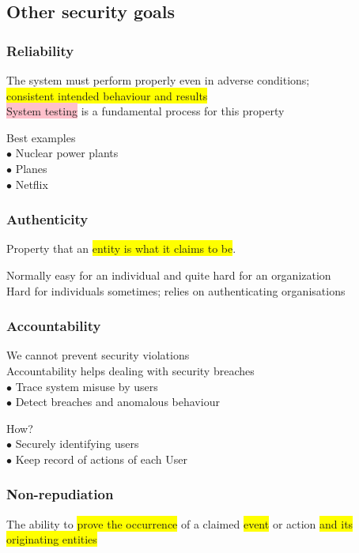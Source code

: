 \documentclass[tikz,border=10pt]{project_plan}
\newcommand{\bulletPoint}{\hspace{-3.1pt}$\bullet$ \hspace{5pt}}
\begin{document}
\subsection{Other security goals}

\subsubsection{Reliability}
The system must perform properly even in adverse conditions;\\
\colorbox{yellow}{consistent intended behaviour and results}\\
\colorbox{pink}{System testing} is a fundamental process for this property

Best examples\\
\bulletPoint Nuclear power plants\\
\bulletPoint Planes\\
\bulletPoint Netflix

\subsubsection{Authenticity}
Property that an \colorbox{yellow}{entity is what it claims to be}.

Normally easy for an individual and quite hard for an organization\\
Hard for individuals sometimes; relies on authenticating organisations

\subsubsection{Accountability}

We cannot prevent security violations\\
Accountability helps dealing with security breaches\\
\bulletPoint Trace system misuse by users\\
\bulletPoint Detect breaches and anomalous behaviour

How?\\
\bulletPoint Securely identifying users\\
\bulletPoint Keep record of actions of each User

\subsubsection{Non-repudiation}
The ability to \colorbox{yellow}{prove the occurrence} of a claimed \colorbox{yellow}{event} or action \colorbox{yellow}{and its originating entities}
\end{document}
